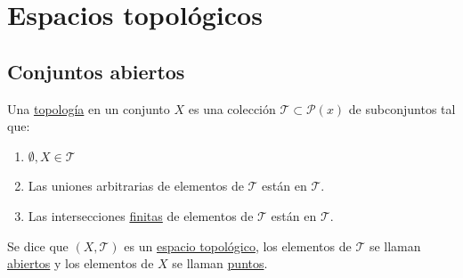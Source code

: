\chapter{Espacios topológicos}%
\label{cha:espacios_topologicos}

\section{Conjuntos abiertos}%
\label{sec:conjuntos_abiertos}
\begin{defi}
Una \underline{topología} en un conjunto $X$ es una colección $\mathcal{T} \subset \mathcal{P}\left( x \right)$ de subconjuntos tal que:
\begin{enumerate}
    \item $\emptyset, X \in \mathcal{T}$ 
    \item Las uniones arbitrarias de elementos de $\mathcal{T}$ están en $\mathcal{T}$.
    \item Las intersecciones \underline{finitas} de elementos de $\mathcal{T}$ están en $\mathcal{T}$.
\end{enumerate}
Se dice que $\left( X, \mathcal{T} \right)$ es un \underline{espacio topológico}, los elementos de $\mathcal{T}$ se llaman \underline{abiertos} y los elementos de $X$ se llaman \underline{puntos}. 
\end{defi}

